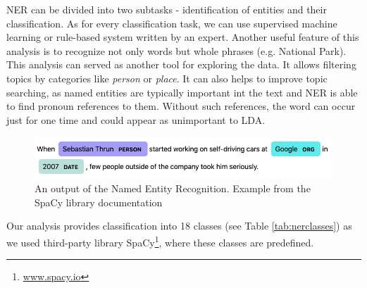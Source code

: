 NER can be divided into two subtasks - identification of entities and their classification. As for every classification task, we can use supervised machine learning or rule-based system written by an expert. Another useful feature of this analysis is to recognize not only words but whole phrases (e.g.  National Park). This analysis can served as another tool for exploring the data. It allows filtering topics by categories like \textit{person} or \textit{place}. It can also helps to improve topic searching, as named entities are typically important int the text and NER is able to find pronoun references to them. Without such references, the word can occur just for one time and could appear as unimportant to LDA.

\begin{figure}[h]
\centering
\includegraphics[width=1\textwidth]{diagrams/NER.png}
\caption{
An output of the Named Entity Recognition. Example from the SpaCy library documentation}
\label{fig:NER}
\end{figure}
Our analysis provides classification into 18 classes (see Table \ref{tab:nerclasses}) as we used third-party library SpaCy\footnote{\url{www.spacy.io}}, where these classes are predefined. 

